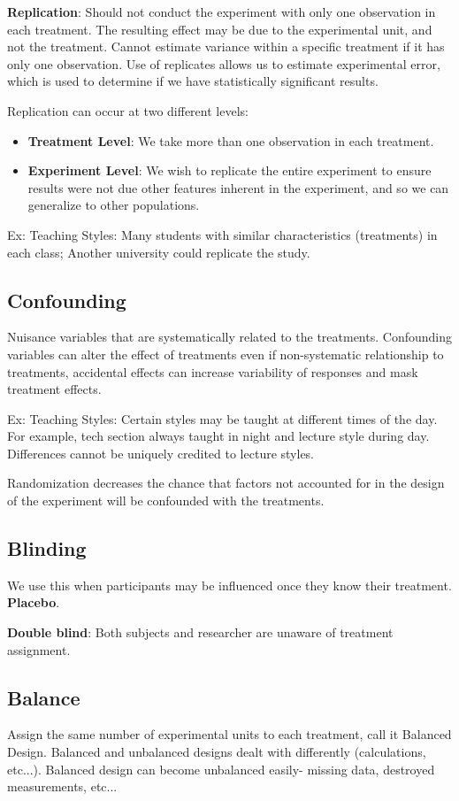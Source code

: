 \documentclass[a4paper,11pt]{article}
\begin{document}
\textbf{Replication}: Should not conduct the experiment with only one observation in each treatment. The resulting effect may be due to the experimental unit, and not the treatment. Cannot estimate variance within a specific treatment if it has only one observation. Use of replicates allows us to estimate {experimental error}, which is used to determine if we have statistically significant results. 

Replication can occur at two different levels: 
\begin{itemize}
\item \textbf{Treatment Level}: We take more than one observation in each treatment. 
\item \textbf{Experiment Level}: We wish to replicate the entire experiment to ensure results were not due other features inherent in the experiment, and so we can generalize to other populations. 
\end{itemize}

Ex: Teaching Styles: Many students with similar characteristics (treatments) in each class; Another university could replicate the study.

\subsection{Confounding}
Nuisance variables that are systematically related to the treatments. Confounding variables can alter the effect of treatments even if non-systematic relationship to treatments, accidental effects can increase variability of responses and mask treatment effects. 

Ex: Teaching Styles: Certain styles may be taught at different times of the day. For example, tech section always taught in night and lecture style during day. Differences cannot be uniquely credited to lecture styles. 

Randomization decreases the chance that factors not accounted for in the design of the experiment will be confounded with the treatments. 

\subsection{Blinding}
We use this when participants may be influenced once they know their treatment. \textbf{Placebo}. 

\textbf{Double blind}: Both subjects and researcher are unaware of treatment assignment. 

\subsection{Balance}
Assign the same number of experimental units to each treatment, call it {Balanced Design}. Balanced and unbalanced designs dealt with differently (calculations, etc...). Balanced design can become unbalanced easily- missing data, destroyed measurements, etc...
\end{document}
